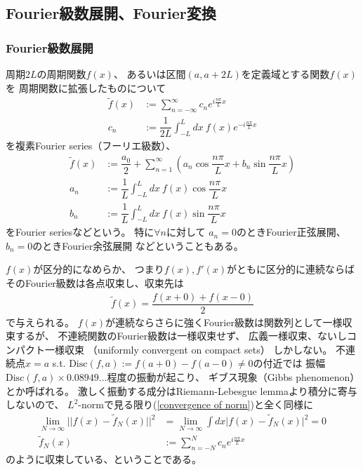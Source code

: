 \newpage
\subsection{Fourier級数展開、Fourier変換}

\subsubsection{Fourier級数展開}

周期$2L$の周期関数$f(x)$、
あるいは区間$(a, a + 2L)$を定義域とする関数$f(x)$を
周期関数に拡張したものについて
\begin{subequations}
\begin{align}
    \tilde{f}(x)
    &:=
    \sum_{n=-\infty}^\infty
    c_n e^{ i\frac{n \pi}{L}x }
\\
    c_n
    &:=
    \dfrac{1}{2L} \int_{-L}^L dx\ 
    f(x) e^{ - i\frac{n \pi}{L}x }
\end{align}
\end{subequations}
を複素Fourier series（フーリエ級数）、
\begin{subequations}
\begin{align}
    \tilde{f}(x)
    &:=
    \dfrac{a_0}{2}
    +
    \sum_{n=1}^\infty
    \left(
        a_n \cos \dfrac{n \pi}{L}x
        +
        b_n \sin \dfrac{n \pi}{L}x
    \right)
\\
    a_n
    &:=
    \dfrac{1}{L} \int_{-L}^L dx\ 
    f(x) \cos\dfrac{n \pi}{L}x
\\
    b_n
    &:=
    \dfrac{1}{L} \int_{-L}^L dx\ 
    f(x) \sin\dfrac{n \pi}{L}x
\end{align}
\end{subequations}
をFourier seriesなどという。
特に$\forall n$に対して
$a_n = 0$のときFourier正弦展開、
$b_n = 0$のときFourier余弦展開
などということもある。

$f(x)$が区分的になめらか、
つまり$f(x), f'(x)$がともに区分的に連続ならば
そのFourier級数は各点収束し、収束先は
\begin{align}
    \tilde{f}(x) = \dfrac{f(x+0) + f(x-0)}{2}
\end{align}
で与えられる。
$f(x)$が連続ならさらに強くFourier級数は関数列として一様収束するが、
不連続関数のFourier級数は一様収束せず、
広義一様収束、ないしコンパクト一様収束
（uniformly convergent on compact sets）
しかしない。
不連続点$x = a$ s.t.
$\mathrm{Disc}(f,a) := f(a+0) - f(a-0) \neq 0$の付近では
振幅$\mathrm{Disc}(f,a) \times 0.08949\dots$程度の振動が起こり、
ギブス現象（Gibbs phenomenon）とか呼ばれる。
激しく振動する成分はRiemann-Lebesgue lemmaより積分に寄与しないので、
$L^2$-normで見る限り(\ref{convergence of norm})と全く同様に
\begin{subequations}
\begin{align}
    \lim_{N\to\infty}\bigg|\bigg|
        f(x) - \tilde{f}_N(x)
    \bigg|\bigg|^2
    &=
    \lim_{N\to\infty}\int dx
    \Big| f(x) - \tilde{f}_N(x) \Big|^2
    = 0
\\
    \tilde{f}_N(x)
    &:=
    \sum_{n=-N}^N
    c_n e^{ i\frac{n \pi}{L}x }
\end{align}
\end{subequations}
のように収束している、ということである。

